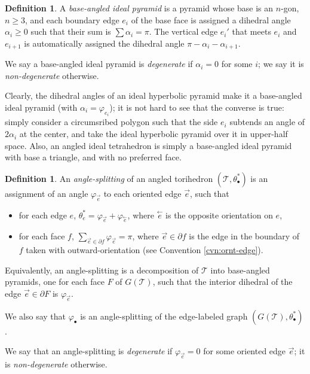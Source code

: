 \documentclass[11pt]{amsart}
\newcommand{\sT}{{\mathcal{T}}}
\newcommand{\cev}[1]{\overset{\leftarrow}{#1}}
\newcommand{\del}{\partial}
\newcommand{\vphi}{\varphi}
\theoremstyle{plain}
\theoremstyle{definition}
\newtheorem{define}[theorem]{Definition}
\newtheorem{definition}[theorem]{Definition}
\begin{document}
\begin{define}
A \emph{base-angled ideal pyramid}
is a pyramid whose base is an $n$-gon, $n \geq 3$,
and each boundary edge $e_i$ of the base face is assigned a dihedral angle
$\alpha_i \geq 0$ such that their sum is $\sum \alpha_i = \pi$.
The vertical edge $e_i'$ that meets $e_i$ and $e_{i+1}$
is automatically assigned the dihedral angle $\pi - \alpha_i - \alpha_{i+1}$.


We say a base-angled ideal pyramid is \emph{degenerate} if
$\alpha_i = 0$ for some $i$; we say it is \emph{non-degenerate} otherwise.
\end{define}


Clearly, the dihedral angles of an ideal hyperbolic pyramid
make it a base-angled ideal pyramid
(with $\alpha_i = \vphi_{e_i}$);
it is not hard to see that the converse is true:
simply consider a circumsribed polygon such that the side $e_i$
subtends an angle of $2\alpha_i$ at the center,
and take the ideal hyperbolic pyramid over it in upper-half space.
Also, an angled ideal tetrahedron is simply a base-angled ideal pyramid
with base a triangle, and with no preferred face.

\begin{definition}
An \emph{angle-splitting} of an angled torihedron $(\sT,\theta_\bullet^*)$
is an assignment of an angle $\vphi_{\vec{e}}$ to each
oriented edge $\vec{e}$, such that

\begin{itemize}
\item for each edge $e$,
$\theta_e^* = \vphi_{\vec{e}} + \vphi_{\cev{e}}$,
where $\cev{e}$ is the opposite orientation on $e$,
\item for each face $f$,
$\sum_{\vec{e} \in \del f} \vphi_{\vec{e}} = \pi$,
where $\vec{e} \in \del f$ is the edge in the boundary of $f$
taken with outward-orientation
(see Convention \ref{cvn:ornt-edge}).
\end{itemize}


Equivalently, an angle-splitting is a decomposition of
$\sT$ into base-angled pyramids,
one for each face $F$ of $G(\sT)$, such that
the interior dihedral of the edge $\vec{e} \in \del F$
is $\vphi_{\vec{e}}$.


We also say that $\vphi_\bullet$ is an angle-splitting
of the edge-labeled graph $(G(\sT), \theta_\bullet^*)$.


We say that an angle-splitting is \emph{degenerate}
if $\vphi_{\vec{e}} = 0$ for some oriented edge $\vec{e}$;
it is \emph{non-degenerate} otherwise.
\end{definition}
\end{document}
